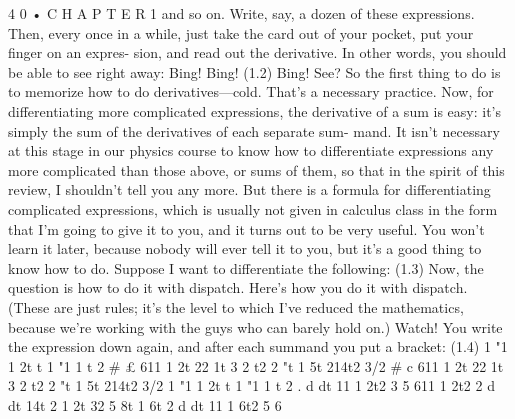 \documentclass[10pt,oneside]{article}
\begin{document}
4 0 • C H A P T E R  1 and so on. Write, say, a dozen of these expressions. Then, every once in a while, just take the card out of your pocket, put your finger on an expres- sion, and read out the derivative. In other words, you should be able to see right away: Bing! Bing! (1.2) Bing! See? So the first thing to do is to memorize how to do derivatives---cold. That’s a necessary practice. Now, for differentiating more complicated expressions, the derivative of a sum is easy: it’s simply the sum of the derivatives of each separate sum- mand. It isn’t necessary at this stage in our physics course to know how to differentiate expressions any more complicated than those above, or sums of them, so that in the spirit of this review, I shouldn’t tell you any more. But there is a formula for differentiating complicated expressions, which is usually not given in calculus class in the form that I’m going to give it to you, and it turns out to be very useful. You won’t learn it later, because nobody will ever tell it to you, but it’s a good thing to know how to do. Suppose I want to differentiate the following: (1.3) Now, the question is how to do it with dispatch. Here’s how you do it with dispatch. (These are just rules; it’s the level to which I’ve reduced the mathematics, because we’re working with the guys who can barely hold on.) Watch! You write the expression down again, and after each summand you put a bracket: (1.4) 1 "1 1 2t t 1 "1 1 t 2 \# £ 611 1 2t 22 1t 3 2 t2 2 "t 1 5t 214t2 3/2 \# c 611 1 2t 22 1t 3 2 t2 2 "t 1 5t 214t2 3/2 1 "1 1 2t t 1 "1 1 t 2 . d dt 11 1 2t2 3 5 611 1 2t2 2 d dt 14t 2 1 2t 32 5 8t 1 6t 2 d dt 11 1 6t2 5 6\par
\end{document}
